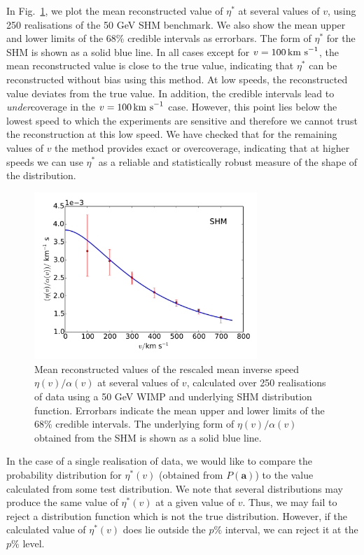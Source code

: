 In Fig.~\ref{fig:Poly:eta_stats}, we plot the mean reconstructed value of $\eta^*$ at several values of $v$, using 250 realisations of the 50 GeV SHM benchmark. We also show the mean upper and lower limits of the 68\% credible intervals as errorbars. The form of $\eta^*$ for the SHM is shown as a solid blue line. In all cases except for $v=100 \,\textrm{km s}^{-1}$, the mean reconstructed value is close to the true value, indicating that $\eta^*$ can be reconstructed without bias using this method. At low speeds, the reconstructed value deviates from the true value. In addition, the credible intervals lead to \textit{under}coverage in the $v=100 \,\textrm{km s}^{-1}$ case. However, this point lies below the lowest speed to which the experiments are sensitive and therefore we cannot trust the reconstruction at this low speed. We have checked that for the remaining values of $v$ the method provides exact or overcoverage, indicating that at higher speeds we can use $\eta^*$ as a reliable and statistically robust measure of the shape of the distribution.

\begin{figure}[t]
\centering
  \includegraphics[width=0.75\textwidth]{Poly/Eta.pdf}
  \caption[Mean reconstructed values of the rescaled mean inverse speed over 250 realisations for a 50 GeV WIMP with SHM distribution function]{Mean reconstructed values of the rescaled mean inverse speed $\eta(v)/\alpha(v)$ at several values of $v$, calculated over 250 realisations of data using a 50 GeV WIMP and underlying SHM distribution function. Errorbars indicate the mean upper and lower limits of the 68\% credible intervals. The underlying form of $\eta(v)/\alpha(v)$ obtained from the SHM is shown as a solid blue line.}
  \label{fig:Poly:eta_stats}
\end{figure}


In the case of a single realisation of data, we would like to compare the probability distribution for $\eta^*(v)$ (obtained from $P(\textbf{a})$) to the value calculated from some test distribution. We note that several distributions may produce the same value of $\eta^*(v)$ at a given value of $v$. Thus, we may fail to reject a distribution function which is not the true distribution. However, if the calculated value of $\eta^*(v)$ does lie outside the $p\%$ interval, we can reject it at the $p\%$ level.

